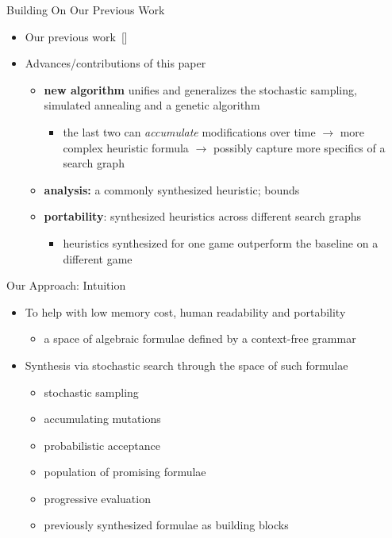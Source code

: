\documentclass[aspectratio=169,usenames,dvipsnames]{beamer}
\newcommand{\tcv}[1]{\textcolor{m4}{#1}}
\newcommand{\tcg}[1]{\textcolor{m5}{#1}}
\newcommand{\bei}{\begin{itemize}}
\newcommand{\eei}{\end{itemize}}
\newcommand{\ie}{\item}
\numberwithin{equation}{section}
\numberwithin{theorem}{section}
\numberwithin{lem}{section}
\numberwithin{df}{section}
\begin{document}
\begin{frame}{Building On Our Previous Work}

\bei

\ie Our previous work~[\cite{cog2021short}]

\bigskip
\bigskip

\ie \tcg{Advances/contributions of this paper}
\bei

\medskip

\ie {\bf new algorithm} unifies and generalizes the stochastic sampling, simulated annealing and a genetic algorithm
\bei
\ie the last two can {\em accumulate} modifications over time $\to$ more complex heuristic formula $\to$ possibly capture more specifics of a search graph
\eei

\medskip

\ie {\bf analysis:} a commonly synthesized heuristic; bounds

\medskip


\ie {\bf portability}: synthesized heuristics across different search graphs
\bei
\ie heuristics synthesized for one game outperform the baseline on a different game
\eei 

\eei

\eei

\end{frame}



\begin{frame}{Our Approach: Intuition}

\bei

\ie To help with low memory cost, human readability and portability
\bei
\ie \tcv{a space of algebraic formulae defined by a context-free grammar}
\eei

\bigskip

\ie Synthesis via stochastic search through the space of such formulae
\bei
\ie \tcv{stochastic sampling}
\ie \tcv{accumulating mutations}
\ie \tcv{probabilistic acceptance}
\ie \tcv{population of promising formulae}
\ie \tcv{progressive evaluation}
\ie \tcv{previously synthesized formulae as building blocks}
\eei

\eei

\end{frame}

\end{document}
